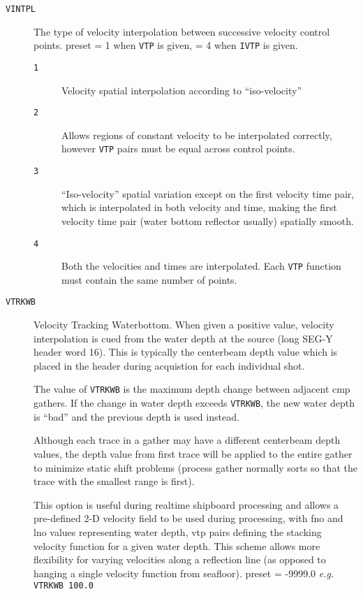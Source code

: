 \begin{description}
\item[\texttt{VINTPL}] The type of velocity interpolation between successive velocity
         control points.
         \Gls{preset} = 1 when \texttt{VTP} is given, = 4 when \texttt{IVTP} is given.
\begin{description}
\item[\texttt{1}] Velocity spatial interpolation according to ``iso-velocity''
\item[\texttt{2}] Allows regions of constant velocity to be interpolated correctly, however \texttt{VTP} pairs must be equal across control points.
\item[\texttt{3}] ``Iso-velocity'' spatial variation except on the first velocity time pair, which is interpolated in both velocity and time, making the first velocity time pair (water bottom reflector usually) spatially smooth.
\item[\texttt{4}] Both the velocities and times are interpolated.  Each \texttt{VTP} function must contain the same number of points.
\end{description}

\item[\texttt{VTRKWB}] Velocity Tracking Waterbottom.  When given a positive value,
         velocity interpolation is cued from the water depth at the source
         (long SEG-Y header word 16). This is typically the centerbeam
         depth value which is placed in the header during acquistion
         for each individual \gls{shot}.

         The value of \texttt{VTRKWB} is the maximum depth change between adjacent
         cmp \glspl{gather}.  If the change in water depth exceeds \texttt{VTRKWB}, the
         new water depth is ``bad'' and the previous depth is used instead.

         Although each trace in a \gls{gather} may have a different centerbeam
         depth values, the depth value from first trace will be applied
         to the entire \gls{gather} to minimize static shift problems (process
         gather normally sorts so that the trace with the smallest range
         is first).

         This option is useful during realtime shipboard processing and allows
         a pre-defined 2-D velocity field to be used during processing,
         with fno and lno values representing water depth, vtp pairs
         defining the stacking velocity function for a given water depth.
         This scheme allows more flexibility for varying velocities along
         a reflection line (as opposed to hanging a single velocity
         function from seafloor).
         \Gls{preset} = -9999.0      \textit{e.g.} \texttt{VTRKWB 100.0}


\end{description}
